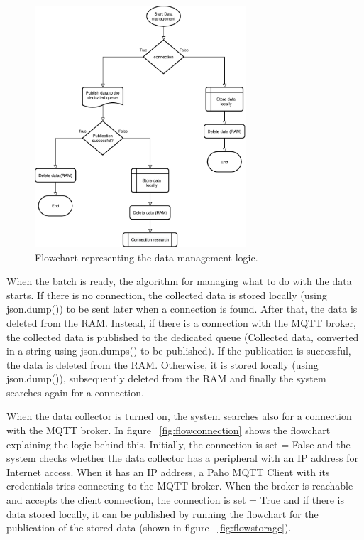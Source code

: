\begin{figure}[h]
\centering 
\includegraphics[width=0.7\textwidth]{images/flowdata} 
\caption{Flowchart representing the data management logic.}
\label{fig:flowdata}
\end{figure}

When the batch is ready, the algorithm for managing what to do with the data starts. If there is no connection, the collected data is stored locally (using json.dump()) to be sent later when a connection is found. After that, the data is deleted from the RAM.
Instead, if there is a connection with the MQTT broker, the collected data is published to the dedicated queue (Collected data, converted in a string using json.dumps() to be published). If the publication is successful, the data is deleted from the RAM. Otherwise, it is stored locally (using json.dump()), subsequently deleted from the RAM and finally the system searches again for a connection.

When the data collector is turned on, the system searches also for a connection with the MQTT broker. In figure ~\ref{fig:flowconnection} shows the flowchart explaining the logic behind this. Initially, the connection is set = False and the system checks whether the data collector has a peripheral with an IP address for Internet access.
When it has an IP address, a Paho MQTT Client with its credentials tries connecting to the MQTT broker. When the broker is reachable and accepts the client connection, the connection is set = True and if there is data stored locally, it can be published by running the flowchart for the publication of the stored data (shown in figure ~\ref{fig:flowstorage}).

